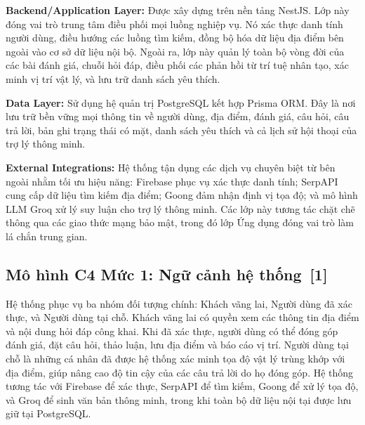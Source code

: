 \documentclass[12pt, a4paper]{article}
\begin{document}
\textbf{Backend/Application Layer:}
Được xây dựng trên nền tảng NestJS. Lớp này đóng vai trò trung tâm điều phối mọi luồng nghiệp vụ. Nó xác thực danh tính người dùng, điều hướng các luồng tìm kiếm, đồng bộ hóa dữ liệu địa điểm bên ngoài vào cơ sở dữ liệu nội bộ. Ngoài ra, lớp này quản lý toàn bộ vòng đời của các bài đánh giá, chuỗi hỏi đáp, điều phối các phản hồi từ trí tuệ nhân tạo, xác minh vị trí vật lý, và lưu trữ danh sách yêu thích.

\textbf{Data Layer:}
Sử dụng hệ quản trị PostgreSQL kết hợp Prisma ORM. Đây là nơi lưu trữ bền vững mọi thông tin về người dùng, địa điểm, đánh giá, câu hỏi, câu trả lời, bản ghi trạng thái có mặt, danh sách yêu thích và cả lịch sử hội thoại của trợ lý thông minh.

\textbf{External Integrations:}
Hệ thống tận dụng các dịch vụ chuyên biệt từ bên ngoài nhằm tối ưu hiệu năng: Firebase phục vụ xác thực danh tính; SerpAPI cung cấp dữ liệu tìm kiếm địa điểm; Goong đảm nhận định vị tọa độ; và mô hình LLM Groq xử lý suy luận cho trợ lý thông minh. Các lớp này tương tác chặt chẽ thông qua các giao thức mạng bảo mật, trong đó lớp Ứng dụng đóng vai trò làm lá chắn trung gian.

\subsection[Mô hình C4 Mức 1: Ngữ cảnh hệ thống]{Mô hình C4 Mức 1: Ngữ cảnh hệ thống \,{\normalfont\small\textcolor{cyan!70!black}{[1]}}}
Hệ thống phục vụ ba nhóm đối tượng chính: Khách vãng lai, Người dùng đã xác thực, và Người dùng tại chỗ. Khách vãng lai có quyền xem các thông tin địa điểm và nội dung hỏi đáp công khai. Khi đã xác thực, người dùng có thể đóng góp đánh giá, đặt câu hỏi, thảo luận, lưu địa điểm và báo cáo vị trí. Người dùng tại chỗ là những cá nhân đã được hệ thống xác minh tọa độ vật lý trùng khớp với địa điểm, giúp nâng cao độ tin cậy của các câu trả lời do họ đóng góp. Hệ thống tương tác với Firebase để xác thực, SerpAPI để tìm kiếm, Goong để xử lý tọa độ, và Groq để sinh văn bản thông minh, trong khi toàn bộ dữ liệu nội tại được lưu giữ tại PostgreSQL.
\end{document}

